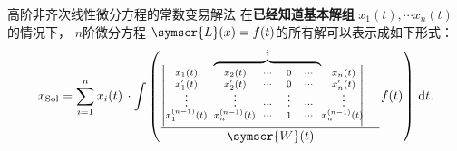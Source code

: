 \begin{tho}{高阶非齐次线性微分方程的常数变易解法}{}
	在\textbf{已经知道基本解组} \(x_1(t),\cdots x_n(t)\)的情况下， \(n\)阶微分方程  \(\symscr{L} (x)=f(t)\)的所有解可以表示成如下形式：
	\[
		x_{\rm Sol}= \sum_{i=1}^{n} x_i(t) \, \cdot \int\left(  \raisebox{-2.5em}{\(\dfrac{{
						\begin{vmatrix}
							\scriptstyle x_1(t)         & \scriptstyle x_2(t)                       & \scriptstyle \cdots & \scriptstyle 0      & \scriptstyle \cdots & \scriptstyle x_n(t)                     \\[-3pt]
							\scriptstyle x_1'(t)        & \scriptstyle x_2'(t)                      & \scriptstyle \cdots & \scriptstyle 0      & \scriptstyle \cdots & \scriptstyle x_n'(t)                    \\[-3pt]
							\scriptstyle \vdots         & \scriptstyle \vdots                       & \scriptstyle \cdots & \scriptstyle \vdots & \scriptstyle \cdots & \scriptstyle \vdots                     \\[-3pt]
							\scriptstyle x_1^{(n-1)}(t) & \!\! \!\scriptstyle x_n^{(n-1)}(t) \!\!\! & \scriptstyle \cdots & \scriptstyle 1      & \scriptstyle \cdots & \!\! \!\scriptstyle x_n^{(n-1)}(t) \!\! \\[3pt]
						\end{vmatrix}\kern-4em\raisebox{1.8em}{$\kern-8em\overset{i}{\overbrace{\phantom{zzxvxvxvxx3wixcb}}}$\kern 4.6em}}}{\symscr{W} (t)}\)}f(t) \right) \,\mathrm{d}t
		.\]
\end{tho}

